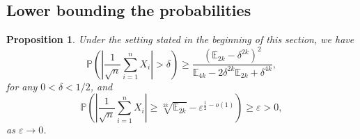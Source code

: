 \documentclass{amsart}
\theoremstyle{plain}
\newtheorem{proposition}[theorem]{Proposition}
\theoremstyle{definition}
\newcommand{\eps}{\varepsilon}
\newcommand{\EE}{\mathbb{E}}
\newcommand{\PP}{\mathbb{P}}
\begin{document}
\subsection{Lower bounding the probabilities}

\begin{proposition}
\label{prop:elliptic}
Under the setting stated in the beginning of this section, we have
\begin{equation}
\label{eq:propLargeProb}
\PP\left(\left|\dfrac{1}{\sqrt{n}}\sum_{i=1}^{n}X_i\right|>\delta\right)\geq\dfrac{(\EE_{2k}-\delta^{2k})^2}{\EE_{4k}-2\delta^{2k}\EE_{2k}+\delta^{4k}},
\end{equation}
for any  $0<\delta<1/2$, and
\begin{equation}
\label{eq:propSmallProb}
\PP\left(\left|\dfrac{1}{\sqrt{n}}\sum_{i=1}^{n}X_i\right|\geq\sqrt[2k]{\EE_{2k}}-\eps^{\frac12-o(1)}\right)\geq\eps>0,
\end{equation}
as $\eps\to0$.
\end{proposition}
\end{document}
